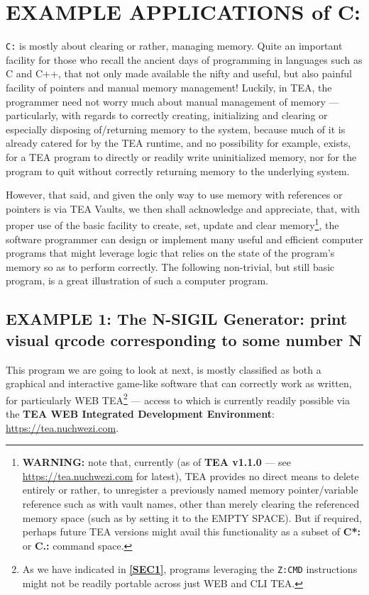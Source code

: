 \documentclass[a4paper, 18pt]{book} %
\begin{document}
\section{EXAMPLE APPLICATIONS of C:}
\label{SECEXAMPC}

\texttt{C:} is mostly about clearing or rather, managing memory. Quite an important facility for those who recall the ancient days of programming in languages such as C and C++, that not only made available the nifty and useful, but also painful facility of pointers and manual memory management! Luckily, in TEA, the programmer need not worry much about manual management of memory --- particularly, with regards to correctly creating, initializing and clearing or especially disposing of/returning memory to the system, because much of it is already catered for by the TEA runtime, and no possibility for example, exists, for a TEA program to directly or readily write uninitialized memory, nor for the program to quit without correctly returning memory to the underlying system.

However, that said, and given the only way to use memory with references or pointers is via TEA Vaults, we then shall acknowledge and appreciate, that, with proper use of the basic facility to create, set, update and clear memory\footnote{\textbf{WARNING:} note that, currently (as of \textbf{TEA v1.1.0} --- see \url{https://tea.nuchwezi.com} for latest), TEA provides no direct means to delete entirely or rather, to unregister a previously named memory pointer/variable reference such as with vault names, other than merely clearing the referenced memory space (such as by setting it to the EMPTY SPACE). But if required, perhaps future TEA versions might avail this functionality as a subset of \textbf{C*:} or \textbf{C.:} command space.}, the software programmer can design or implement many useful and efficient computer programs that might leverage logic that relies on the state of the program's memory so as to perform correctly. The following non-trivial, but still basic program, is a great illustration of such a computer program.


\subsection{EXAMPLE 1: The N-SIGIL Generator: print visual qrcode corresponding to some number N}
\label{SECEXAMP1C}

This program we are going to look at next, is mostly classified as both a graphical and interactive game-like software that can correctly work as written, for particularly WEB TEA\footnote{As we have indicated in \textbf{\autoref{SEC1}}, programs leveraging the \texttt{Z:CMD} instructions might not be readily portable across just WEB and CLI TEA.} --- access to which is currently readily possible via the \textbf{TEA WEB Integrated Development Environment}: \url{https://tea.nuchwezi.com}.
\end{document}
